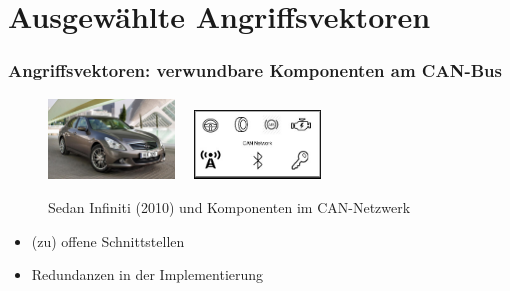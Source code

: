 \documentclass[t]{beamer}
\begin{document}
\section{Ausgewählte Angriffsvektoren} %
\begin{frame}
	\frametitle{Angriffsvektoren: verwundbare Komponenten am CAN-Bus}
    \begin{center}
    	\begin{figure}
			\includegraphics[width=0.3\textwidth]{pic/remote_attack_images-026.jpg} \ \
			\includegraphics[width=0.3\textwidth]{pic/remote_attack_images-027.jpg}
      	  	\caption[2010 Infiniti G37 (Sedan)]{Sedan Infiniti (2010) und Komponenten im CAN-Netzwerk}
			\cite{Quellen}
		\end{figure}
	\end{center}
	\begin{itemize}
		\item (zu) offene Schnittstellen
  	    \item Redundanzen in der Implementierung
	\end{itemize}
\end{frame}
\end{document}
